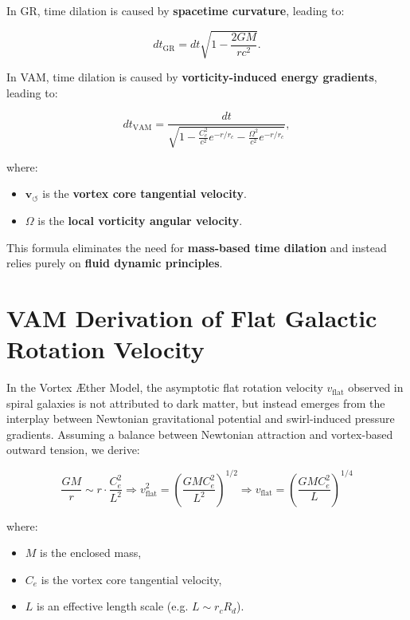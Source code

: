 \documentclass[preprint]{revtex4-2}
\begin{document}
    In GR, time dilation is caused by \textbf{spacetime curvature}, leading to:

    \begin{equation*}
        dt_\text{GR} = dt \sqrt{1 - \frac{2GM}{rc^2}}.
    \end{equation*}

    In VAM, time dilation is caused by \textbf{vorticity-induced energy gradients}, leading to:

    \begin{equation*}
        dt_\text{VAM} = \frac{dt}{\sqrt{1 - \frac{C_e^2}{c^2} e^{-r/r_c} - \frac{\Omega^2}{c^2} e^{-r/r_c}}},
    \end{equation*}

    where:
    \begin{itemize}
        \item  \( \mathbf{v}_{\scriptscriptstyle\boldsymbol{\circlearrowleft}} \) is the \textbf{vortex core tangential velocity}.
        \item  \( \Omega \) is the \textbf{local vorticity angular velocity}.
    \end{itemize}


    This formula eliminates the need for \textbf{mass-based time dilation} and instead relies purely on \textbf{fluid dynamic principles}.


        \section*{VAM Derivation of Flat Galactic Rotation Velocity}

        In the Vortex \AE{}ther Model, the asymptotic flat rotation velocity $v_{\text{flat}}$ observed in spiral galaxies is not attributed to dark matter, but instead emerges from the interplay between Newtonian gravitational potential and swirl-induced pressure gradients. Assuming a balance between Newtonian attraction and vortex-based outward tension, we derive:

        \[
            \frac{G M}{r} \sim r \cdot \frac{C_e^2}{L^2} \Rightarrow
            v_{\text{flat}}^2 = \left( \frac{G M C_e^2}{L^2} \right)^{1/2} \Rightarrow
            \boxed{v_{\text{flat}} = \left( \frac{G M C_e^2}{L} \right)^{1/4}}
        \]

        where:
        \begin{itemize}
            \item  $M$ is the enclosed mass,
            \item  $C_e$ is the vortex core tangential velocity,
            \item  $L$ is an effective length scale (e.g. $L \sim r_c R_d$).
        \end{itemize}
\end{document}
